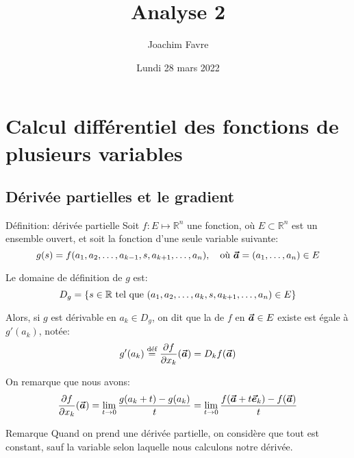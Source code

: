 \documentclass[a4paper]{article}
\title{Analyse 2}
\author{Joachim Favre}
\date{Lundi 28 mars 2022}
\begin{document}
\maketitle


\section[Calcul différentiel]{Calcul différentiel des fonctions de plusieurs variables}
\subsection{Dérivée partielles et le gradient}
\begin{parag}{Définition: dérivée partielle}
    Soit $f: E \mapsto \mathbb{R}^n$ une fonction, où $E \subset \mathbb{R}^n$ est un ensemble ouvert, et soit la fonction d'une seule variable suivante: 
    \[g\left(s\right) = f\left(a_1, a_2, \ldots, a_{k-1}, s, a_{k+1}, \ldots, a_n\right), \mathspace \text{où } \bvec{a} = \left(a_1, \ldots, a_n\right) \in E\]
    
    Le domaine de définition de $g$ est:
    \[D_g = \left\{s \in \mathbb{R} \telque \left(a_1, a_2, \ldots, a_k, s, a_{k+1}, \ldots, a_n\right) \in E\right\}\]
     
    Alors, si $g$ est dérivable en $a_k \in D_g$, on dit que la  de $f$ en $\bm{\protect\vec{a}} \in E$ existe est égale à $g'\left(a_k\right)$, notée: 
    \[g'\left(a_k\right) \over{=}{déf} \frac{\partial f}{\partial x_k}\left(\bvec{a}\right) = D_k f\left(\bvec{a}\right)\]
    
    On remarque que nous avons: 
    \[\frac{\partial f}{\partial x_k}\left(\bvec{a}\right) = \lim_{t \to 0} \frac{g\left(a_k + t\right) - g\left(a_k\right)}{t} = \lim_{t \to 0} \frac{f\left(\bvec{a} + t \bvec{e}_k\right) - f\left(\bvec{a}\right)}{t}\]
    
    \begin{subparag}{Remarque}
        Quand on prend une dérivée partielle, on considère que tout est constant, sauf la variable selon laquelle nous calculons notre dérivée.
    \end{subparag}
\end{parag}
\end{document}
